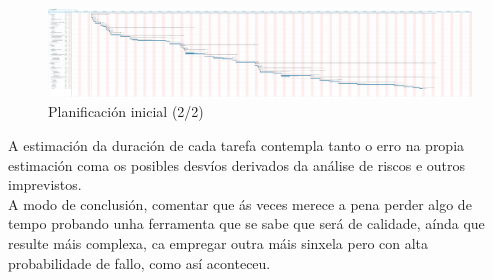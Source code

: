 \begin{figure}[htbp]
 \centering
 \includegraphics[trim=0 5cm 230cm 31cm,clip=true,scale=0.6,keepaspectratio=true]{./imagenes/planificacion-inicial.png}
 \caption[Planificación inicial (2/2)]{Planificación inicial (2/2) \cite{LibrePlan}}
 \label{figura:PlanificacionInicial2}
\end{figure}

A estimación da duración de cada tarefa contempla tanto o erro na propia
estimación coma os posibles desvíos derivados da análise de riscos e outros
imprevistos.\\

A modo de conclusión, comentar que ás veces merece a pena perder algo de tempo
probando unha ferramenta que se sabe que será de calidade, aínda que resulte
máis complexa, ca empregar outra máis sinxela pero con alta probabilidade de
fallo, como así aconteceu.